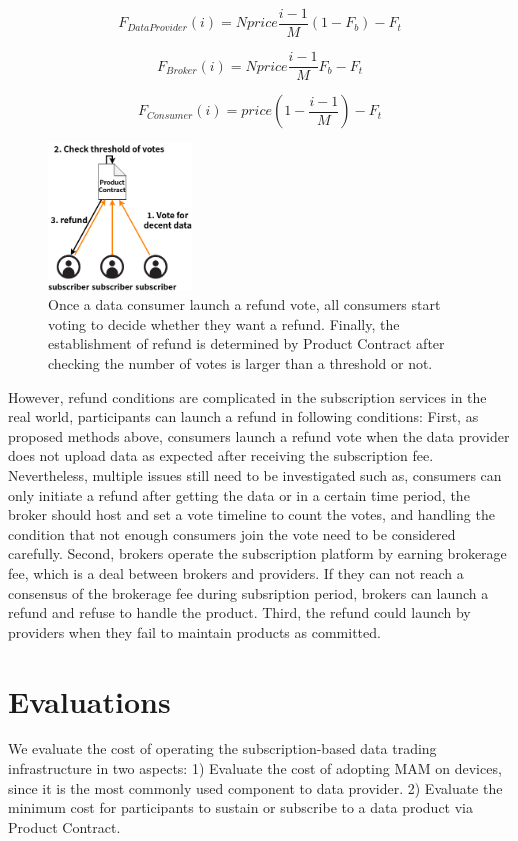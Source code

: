 \documentclass[conference]{IEEEtran}
\begin{document}
\begin{equation}
    F_{DataProvider}(i) = Nprice \frac{i-1}{M} (1-F_{b}) -F_{t}
\end{equation}

\begin{equation}
    F_{Broker}(i) = Nprice \frac{i-1}{M} F_{b} -F_{t}
\end{equation}

\begin{equation}
    F_{Consumer}(i) = price (1-\frac{i-1}{M}) -F_{t}
\end{equation}

\begin{figure}[h]
    \centering
    \includegraphics[width=1.5in]{refund}
    \caption{Once a data consumer launch a refund vote, all consumers start voting to decide whether they want a refund. Finally, the establishment of refund is determined by Product Contract after checking the number of votes is larger than a threshold or not.}
    \label{fig:refund}
\end{figure}

However, refund conditions are complicated in the subscription services in the real world, participants can launch a refund in following conditions: First, as proposed methods above, consumers launch a refund vote when the data provider does not upload data as expected after receiving the subscription fee. Nevertheless, multiple issues still need to be investigated such as, consumers can only initiate a refund after getting the data or in a certain time period, the broker should host and set a vote timeline to count the votes, and handling the condition that not enough consumers join the vote need to be considered carefully. Second, brokers operate the subscription platform by earning brokerage fee, which is a deal between brokers and providers. If they can not reach a consensus of the brokerage fee during subsription period, brokers can launch a refund and refuse to handle the product. Third, the refund could launch by providers when they fail to maintain products as committed.

\section{Evaluations}
\label{section:evaluation}
We evaluate the cost of operating the subscription-based data trading infrastructure in two aspects: 1) Evaluate the cost of adopting MAM on devices, since it is the most commonly used component to data provider. 2) Evaluate the minimum cost for participants to sustain or subscribe to a data product via Product Contract.
\end{document}
